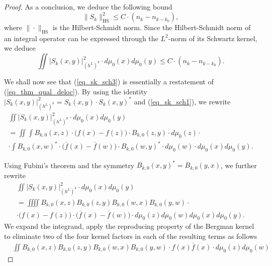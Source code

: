 \documentclass[12pt]{article}
\numberwithin{equation}{section}
\theoremstyle{theorem}
\theoremstyle{definition}
\theoremstyle{remark}
\begin{document}
\begin{proof}
		As a conclusion, we deduce the following bound
		\begin{equation}\label{eq_sk_sch2}
			\| S_k \|_{{\textrm{HS}}}^2 \leq C \cdot (n_k - n_{k - k_0}),
		\end{equation}
		where $\| \cdot \|_{{\textrm{HS}}}$ is the Hilbert-Schmidt norm.
		Since the Hilbert-Schmidt norm of an integral operator can be expressed through the $L^2$-norm of its Schwartz kernel, we deduce
		\begin{equation}\label{eq_sk_sch3}
			\iint \big| S_k(x, y) \big|^2_{(h^L)^k} \cdot d \mu_0(x) d \mu_0(y) \leq  C \cdot (n_k - n_{k - k_0}).
		\end{equation}
		\par 
		\begin{sloppypar}
		We shall now see that (\ref{eq_sk_sch3}) is essentially a restatement of (\ref{eq_thm_qual_deloc}).
		By using the identity $\big| S_k(x, y) \big|^2_{(h^L)^k} = S_k(x, y) \cdot S_k(x, y)^*$ and (\ref{eq_sk_sch1}), we rewrite 
		\begin{multline}\label{eq_sk_sch4}
			\iint \big| S_k(x, y) \big|^2_{(h^L)^k} \cdot  d \mu_0(x) d \mu_0(y) 
			\\
			=
			\iint  \int B_{k, 0}(x, z) \cdot \big( f(x) - f(z) \big) \cdot B_{k, 0}(z, y) \cdot d \mu_0(z) \cdot
			\\
			\cdot \int  B_{k, 0}(x, w)^* \cdot \big( \overline{f}(x) - \overline{f}(w) \big) \cdot B_{k, 0}(w, y)^*  \cdot  d \mu_0(w)  \cdot  d \mu_0(x) d \mu_0(y).
		\end{multline}
		\end{sloppypar}
		\noindent
		Using Fubini's theorem and the symmetry $B_{k, 0}(x, y)^* = B_{k, 0}(y, x)$, we further rewrite
		\begin{multline}\label{eq_sk_sch5}
			\iint \big| S_k(x, y) \big|^2_{(h^L)^k} \cdot  d \mu_0(x) d \mu_0(y) 
			\\
			=
			\iiiint B_{k, 0}(x, z) B_{k, 0}(z, y) B_{k, 0}(w, x) B_{k, 0}(y, w) \cdot 
			\\
			\cdot \big( f(x) - f(z) \big) \cdot \big( \overline{f}(x) - \overline{f}(w) \big) \cdot  d \mu_0(z) d \mu_0(w) d \mu_0(x) d \mu_0(y).
		\end{multline}
		We expand the integrand, apply the reproducing property of the Bergman kernel to eliminate two of the four kernel factors in each of the resulting terms as follows
		\begin{equation}
		\begin{aligned}
			&\iint B_{k, 0}(x, z) B_{k, 0}(z, y) B_{k, 0}(w, x) B_{k, 0}(y, w) \cdot f(x) \overline{f}(x) \cdot  d \mu_0(z) d \mu_0(w)

\end{aligned}
\end{equation}
\end{proof}
\end{document}
